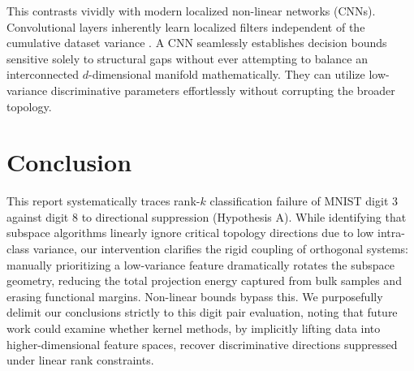 \documentclass[11pt, a4paper]{article}
\begin{document}
This contrasts vividly with modern localized non-linear networks (CNNs). Convolutional layers inherently learn localized filters independent of the cumulative dataset variance \cite{lecun1998gradient}. A CNN seamlessly establishes decision bounds sensitive solely to structural gaps without ever attempting to balance an interconnected $d$-dimensional manifold mathematically. They can utilize low-variance discriminative parameters effortlessly without corrupting the broader topology. 

\section{Conclusion}
\label{sec:conclusion}
This report systematically traces rank-$k$ classification failure of MNIST digit 3 against digit 8 to directional suppression (Hypothesis A). While identifying that subspace algorithms linearly ignore critical topology directions due to low intra-class variance, our intervention clarifies the rigid coupling of orthogonal systems: manually prioritizing a low-variance feature dramatically rotates the subspace geometry, reducing the total projection energy captured from bulk samples and erasing functional margins. Non-linear bounds bypass this. We purposefully delimit our conclusions strictly to this digit pair evaluation, noting that future work could examine whether kernel methods, by implicitly lifting data into higher-dimensional feature spaces, recover discriminative directions suppressed under linear rank constraints.



\end{document}
